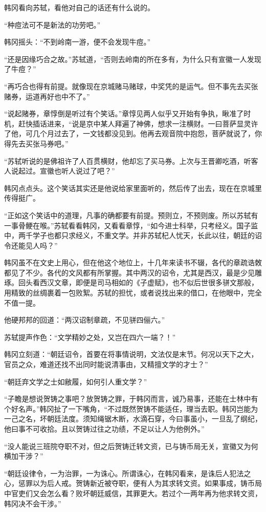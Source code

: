 韩冈看向苏轼，看他对自己的话还有什么说的。

“种痘法可不是新法的功劳吧。”

韩冈摇头：“不到岭南一游，便不会发现牛痘。”

“还是因缘巧合之故。”苏轼道，“否则去岭南的所在多有，为什么只有宣徽一人发现了牛痘？”

“再巧合也得有前提。就像现在京城赌马赌球，中奖凭的是运气。但不事先去买张赌券，运道再好也中不了。”

“说起赌券，章惇倒是听过有个笑话。”章惇见两人似乎又开始有争执，瞅准了时机，赶快插话进来，“说是京中某人拜遍了神佛，想求一注横财。一曰菩萨显灵许了他，可几个月过去了，一文钱都没见到。他再去观音院中抱怨，菩萨就说了，你得先去买张马券吧。”

“苏轼听说的是佛祖许了人百贯横财，他却忘了买马券。上次与王晋卿吃酒，听客人说起过。宣徽也听人说过了吧？”

韩冈点点头。这个笑话其实还是他说给家里面听的，然后传了出去，现在在京城里传得挺广。

“正如这个笑话中的道理，凡事的确都要有前提。预则立，不预则废。所以苏轼有一事骨鲠在喉。”苏轼看看韩冈，又看看章惇，“如今进士科举，只考经义。国子监中，两千学子也都只求经义，不重文学。并非苏轼杞人忧天，长此以往，朝廷的诏令还能见人吗？”

韩冈虽不在文史上用心，但在他这个地位上，十几年来读书不辍，各代的章疏诰敇都见了不少。各代的文风都有所掌握。其中两汉的诏令，尤其是西汉，最是少见雕琢。回头看西汉文章，即便是司马相如的《子虚赋》，也不似后世很多骈文那般，用精致的丝绸裹着一包败絮。苏轼的担忧，或者说找出来的借口，在他眼中，完全不值一提。

他硬邦邦的回道：“两汉诏制章疏，不见骈四俪六。”

苏轼提声作色：“文学精妙之处，又岂在四六一端？！”

韩冈立刻道：“朝廷诏令，首要在将事情说明，文法仅是末节。何况以天下之大，官员之众，难道还找不出同时能说清事由，又精擅文学的才士？”

“朝廷弃文学之士如敝履，如何引人重文学？”

“子瞻是想说贺铸之事吧？放贺铸之罪，于韩冈而言，诚乃易事，还能在士林中有个好名声。”韩冈扯了一下嘴角，“不过既然贺铸不能适任，理当去职。韩冈岂能为一己之名，坏朝廷法度。须知绳锯木断，水滴石穿，今曰事虽小，一旦乱了纲纪，他曰事不可收拾。且以贺铸过往之功绩，不足以让人为他例外。”

“没人能说三班院夺职不对，但之后贺铸迁转文资，已与铸币局无关，宣徽又为何横加干涉？”

“朝廷设律令，一为治罪，一为诛心。所谓诛心，在韩冈看来，是诛后人犯法之心，惩罪以为后人戒。贺铸新近被夺职，便有人为其求转文资。如果事成，铸币局中官吏们又会怎么看？败坏朝廷威信，其罪更大。若过个一两年再为他求转文资，韩冈决不会干涉。”

